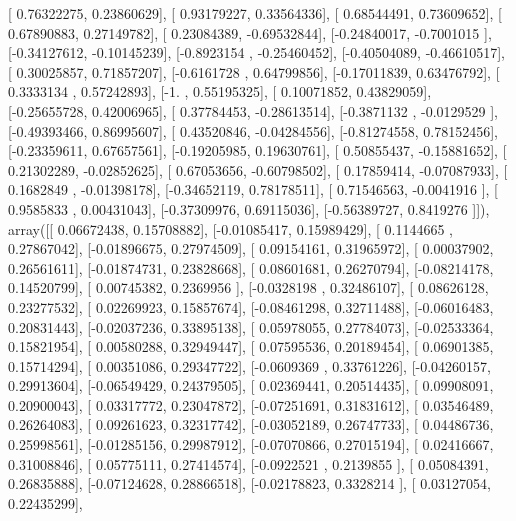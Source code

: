 \documentclass{article}
\begin{document}
       [ 0.76322275,  0.23860629],
       [ 0.93179227,  0.33564336],
       [ 0.68544491,  0.73609652],
       [ 0.67890883,  0.27149782],
       [ 0.23084389, -0.69532844],
       [-0.24840017, -0.7001015 ],
       [-0.34127612, -0.10145239],
       [-0.8923154 , -0.25460452],
       [-0.40504089, -0.46610517],
       [ 0.30025857,  0.71857207],
       [-0.6161728 ,  0.64799856],
       [-0.17011839,  0.63476792],
       [ 0.3333134 ,  0.57242893],
       [-1.        ,  0.55195325],
       [ 0.10071852,  0.43829059],
       [-0.25655728,  0.42006965],
       [ 0.37784453, -0.28613514],
       [-0.3871132 , -0.0129529 ],
       [-0.49393466,  0.86995607],
       [ 0.43520846, -0.04284556],
       [-0.81274558,  0.78152456],
       [-0.23359611,  0.67657561],
       [-0.19205985,  0.19630761],
       [ 0.50855437, -0.15881652],
       [ 0.21302289, -0.02852625],
       [ 0.67053656, -0.60798502],
       [ 0.17859414, -0.07087933],
       [ 0.1682849 , -0.01398178],
       [-0.34652119,  0.78178511],
       [ 0.71546563, -0.0041916 ],
       [ 0.9585833 ,  0.00431043],
       [-0.37309976,  0.69115036],
       [-0.56389727,  0.8419276 ]]), array([[ 0.06672438,  0.15708882],
       [-0.01085417,  0.15989429],
       [ 0.1144665 ,  0.27867042],
       [-0.01896675,  0.27974509],
       [ 0.09154161,  0.31965972],
       [ 0.00037902,  0.26561611],
       [-0.01874731,  0.23828668],
       [ 0.08601681,  0.26270794],
       [-0.08214178,  0.14520799],
       [ 0.00745382,  0.2369956 ],
       [-0.0328198 ,  0.32486107],
       [ 0.08626128,  0.23277532],
       [ 0.02269923,  0.15857674],
       [-0.08461298,  0.32711488],
       [-0.06016483,  0.20831443],
       [-0.02037236,  0.33895138],
       [ 0.05978055,  0.27784073],
       [-0.02533364,  0.15821954],
       [ 0.00580288,  0.32949447],
       [ 0.07595536,  0.20189454],
       [ 0.06901385,  0.15714294],
       [ 0.00351086,  0.29347722],
       [-0.0609369 ,  0.33761226],
       [-0.04260157,  0.29913604],
       [-0.06549429,  0.24379505],
       [ 0.02369441,  0.20514435],
       [ 0.09908091,  0.20900043],
       [ 0.03317772,  0.23047872],
       [-0.07251691,  0.31831612],
       [ 0.03546489,  0.26264083],
       [ 0.09261623,  0.32317742],
       [-0.03052189,  0.26747733],
       [ 0.04486736,  0.25998561],
       [-0.01285156,  0.29987912],
       [-0.07070866,  0.27015194],
       [ 0.02416667,  0.31008846],
       [ 0.05775111,  0.27414574],
       [-0.0922521 ,  0.2139855 ],
       [ 0.05084391,  0.26835888],
       [-0.07124628,  0.28866518],
       [-0.02178823,  0.3328214 ],
       [ 0.03127054,  0.22435299],
\end{document}
